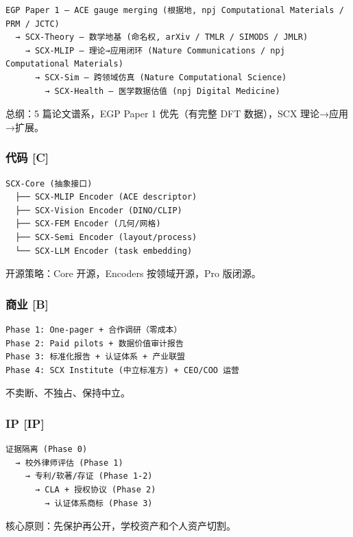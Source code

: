 \documentclass[
  12pt,
]{ctexart}
\begin{document}
\begin{verbatim}
EGP Paper 1 — ACE gauge merging (根据地, npj Computational Materials / PRM / JCTC)
  → SCX-Theory — 数学地基 (命名权, arXiv / TMLR / SIMODS / JMLR)
    → SCX-MLIP — 理论→应用闭环 (Nature Communications / npj Computational Materials)
      → SCX-Sim — 跨领域仿真 (Nature Computational Science)
        → SCX-Health — 医学数据估值 (npj Digital Medicine)
\end{verbatim}

总纲：5 篇论文谱系，EGP Paper 1 优先（有完整 DFT 数据），SCX
理论→应用→扩展。

\subsubsection{代码 {[}C{]}}\label{ux4ee3ux7801-c}

\begin{verbatim}
SCX-Core (抽象接口)
  ├── SCX-MLIP Encoder (ACE descriptor)
  ├── SCX-Vision Encoder (DINO/CLIP)
  ├── SCX-FEM Encoder (几何/网格)
  ├── SCX-Semi Encoder (layout/process)
  └── SCX-LLM Encoder (task embedding)
\end{verbatim}

开源策略：Core 开源，Encoders 按领域开源，Pro 版闭源。

\subsubsection{商业 {[}B{]}}\label{ux5546ux4e1a-b}

\begin{verbatim}
Phase 1: One-pager + 合作调研（零成本）
Phase 2: Paid pilots + 数据价值审计报告
Phase 3: 标准化报告 + 认证体系 + 产业联盟
Phase 4: SCX Institute (中立标准方) + CEO/COO 运营
\end{verbatim}

不卖断、不独占、保持中立。

\subsubsection{IP {[}IP{]}}\label{ip-ip}

\begin{verbatim}
证据隔离 (Phase 0)
  → 校外律师评估 (Phase 1)
    → 专利/软著/存证 (Phase 1-2)
      → CLA + 授权协议 (Phase 2)
        → 认证体系商标 (Phase 3)
\end{verbatim}

核心原则：先保护再公开，学校资产和个人资产切割。
\end{document}
